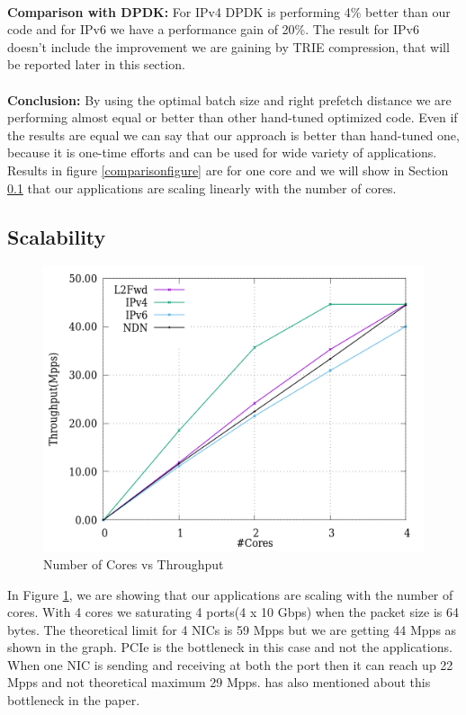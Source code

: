 \\
\textbf{Comparison with DPDK\cite{DPDK}:} For IPv4 DPDK is performing 4\% better than our code and for IPv6 we have a performance gain of 20\%. The result for IPv6 doesn't include the improvement we are gaining by TRIE compression, that will be reported later in this section.
\\
\\
\textbf{Conclusion:} By using the optimal batch size and right prefetch distance we are performing almost equal or better than other hand-tuned optimized code. Even if the results are equal we can say that our approach is better than hand-tuned one, because it is one-time efforts and can be used for wide variety of applications. Results in figure \ref{comparisonfigure} are for one core and we will show in Section \ref{scalability} that our applications are scaling linearly with the number of cores.


\subsection{Scalability}
\label{scalability}
\begin{figure}[ht]
\includegraphics[width = \linewidth]{Figures/cores.png}
\caption{Number of Cores vs Throughput}
\label{cores}
\end{figure}
In Figure \ref{cores}, we are showing that our applications are scaling with the number of cores. With 4 cores we saturating 4 ports(4 x 10 Gbps) when the packet size is 64 bytes.
The theoretical limit for 4 NICs is 59 Mpps but we are getting 44 Mpps as shown in the graph. PCIe is the bottleneck in this case and not the applications. When one NIC is sending and receiving at both the port then it can reach up 22 Mpps and not theoretical maximum 29 Mpps. \cite{Zhou:2013:SHP:2535372.2535379} has also mentioned about this bottleneck in the paper.

